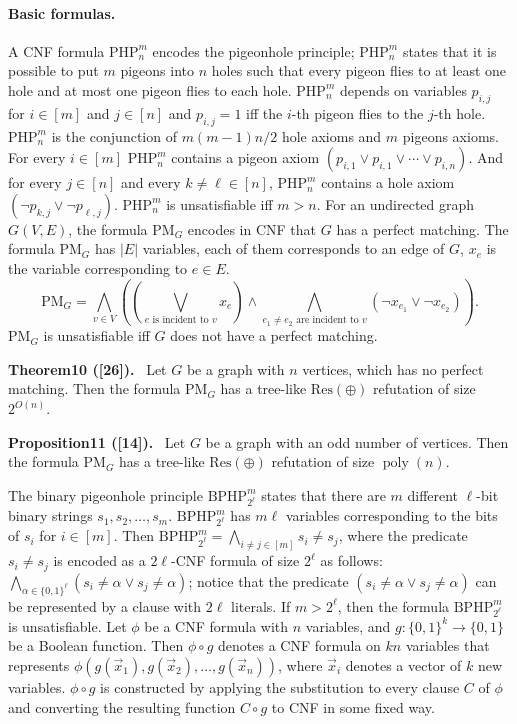 \documentclass[10pt,a4paper]{article}
\newenvironment{authorclaim}[1]{\par\medskip\noindent\textbf{#1.}\ \ignorespaces}{\par\medskip}
\begin{document}
\paragraph{Basic formulas.} A CNF formula $\mathrm{PHP}_n^m$ encodes the pigeonhole principle; $\mathrm{PHP}_n^m$ states that it is possible to put $m$ pigeons into $n$ holes such that every pigeon flies to at least one hole and at most one pigeon flies to each hole. $\mathrm{PHP}_n^m$ depends on variables $p_{i,j}$ for $i\in[m]$ and $j\in[n]$ and $p_{i,j}=1$ iff the $i$-th pigeon flies to the $j$-th hole. $\mathrm{PHP}_n^m$ is the conjunction of $m(m-1)n/2$ hole axioms and $m$ pigeons axioms. For every $i\in[m]$ $\mathrm{PHP}_n^m$ contains a pigeon axiom $(p_{i,1}\vee p_{i,1}\vee\cdots\vee p_{i,n})$. And for every $j\in[n]$ and every $k\ne\ell\in[n]$, $\mathrm{PHP}_n^m$ contains a hole axiom $(\neg p_{k,j}\vee\neg p_{\ell,j})$. $\mathrm{PHP}_n^m$ is unsatisfiable iff $m>n$.
For an undirected graph $G(V,E)$, the formula $\mathrm{PM}_G$ encodes in CNF that $G$ has a perfect matching. The formula $\mathrm{PM}_G$ has $|E|$ variables, each of them corresponds to an edge of $G$, $x_e$ is the variable corresponding to $e\in E$.
\[\mathrm{PM}_G=\bigwedge_{v\in V}\left(\left(\bigvee_{e\text{ is incident to }v}x_e\right)\wedge\bigwedge_{e_1\ne e_2\text{ are incident to }v}(\neg x_{e_1}\vee\neg x_{e_2})\right).\]
$\mathrm{PM}_G$ is unsatisfiable iff $G$ does not have a perfect matching.
\begin{authorclaim}{Theorem10 ([26])}
Let $G$ be a graph with $n$ vertices, which has no perfect matching. Then the formula $\mathrm{PM}_G$ has a tree-like $\mathrm{Res}(\oplus)$ refutation of size $2^{O(n)}$.
\end{authorclaim}
\begin{authorclaim}{Proposition11 ([14])}
Let $G$ be a graph with an odd number of vertices. Then the formula $\mathrm{PM}_G$ has a tree-like $\mathrm{Res}(\oplus)$ refutation of size $\operatorname{poly}(n)$.
\end{authorclaim}
The binary pigeonhole principle $\mathrm{BPHP}_{2^\ell}^m$ states that there are $m$ different $\ell$-bit binary strings $s_1,s_2,\ldots,s_m$. $\mathrm{BPHP}_{2^\ell}^m$ has $m\ell$ variables corresponding to the bits of $s_i$ for $i\in[m]$. Then $\mathrm{BPHP}_{2^\ell}^m=\bigwedge_{i\ne j\in[m]}s_i\ne s_j$, where the predicate $s_i\ne s_j$ is encoded as a $2\ell$-CNF formula of size $2^\ell$ as follows: $\bigwedge_{\alpha\in\{0,1\}^\ell}(s_i\ne\alpha\vee s_j\ne\alpha)$; notice that the predicate $(s_i\ne\alpha\vee s_j\ne\alpha)$ can be represented by a clause with $2\ell$ literals. If $m>2^\ell$, then the formula $\mathrm{BPHP}_{2^\ell}^m$ is unsatisfiable.
Let $\phi$ be a CNF formula with $n$ variables, and $g:\{0,1\}^k\to\{0,1\}$ be a Boolean function. Then $\phi\circ g$ denotes a CNF formula on $kn$ variables that represents $\phi(g(\vec x_1),g(\vec x_2),\ldots,g(\vec x_n))$, where $\vec x_i$ denotes a vector of $k$ new variables. $\phi\circ g$ is constructed by applying the substitution to every clause $C$ of $\phi$ and converting the resulting function $C\circ g$ to CNF in some fixed way.
\end{document}
